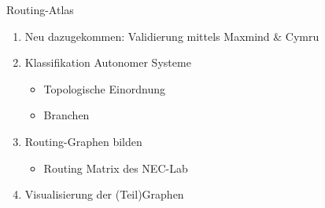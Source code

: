 \documentclass[ngerman,compress,hyperref={bookmarks}]{beamer}
\begin{document}
\begin{frame}[allowframebreaks]{Routing-Atlas}
\begin{enumerate}
  \item Neu dazugekommen: Validierung mittels Maxmind \& Cymru
  \item Klassifikation Autonomer Systeme
  \begin{itemize}
    \item Topologische Einordnung
    \item Branchen
  \end{itemize}
  \item Routing-Graphen bilden
  \begin{itemize}
    \item Routing Matrix des NEC-Lab
  \end{itemize}
  \framebreak
  \item Visualisierung der (Teil)Graphen
  \end{enumerate}


\end{frame}
\end{document}
